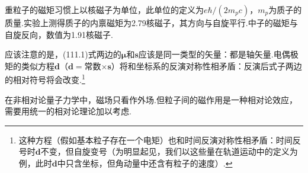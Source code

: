 重粒子的磁矩习惯上以核磁子为单位，此单位的定义为$e\hbar/(2m_pc)$，$m_p$为质子的质量.实验上测得质子的内禀磁矩为2.79核磁子，其方向与自旋平行.中子的磁矩与自旋反向，数值为1.91核磁子.

应该注意的是，(111.1)式两边的$\boldsymbol{\mu}$和$\boldsymbol{s}$应该是同一类型的矢量：都是轴矢量.电偶极矩的类似方程$\boldsymbol{d}$（$\boldsymbol{d}=$常数$\times\boldsymbol{s}$）将和坐标系的反演对称性相矛盾：反演后式子两边的相对符号将会改变.\footnote{这种方程（假如基本粒子存在一个电矩）也和时间反演对称性相矛盾：时间反号时$\boldsymbol{d}$不变，但自旋变号（为明显起见，我们以这些量在轨道运动中的定义为例，此时$\boldsymbol{d}$中只含坐标，但角动量中还含有粒子的速度）.}

在非相对论量子力学中，磁场只看作外场.但粒子间的磁作用是一种相对论效应，需要用统一的相对论理论加以考虑.

